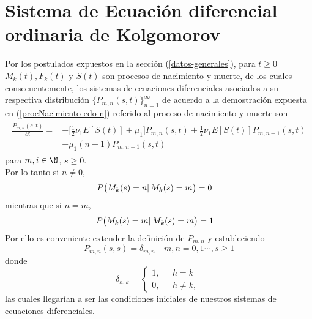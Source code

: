 \section{Sistema de Ecuación diferencial ordinaria de Kolgomorov}
Por los postulados expuestos en la sección (\ref{datos-generales}), para $t\geq 0$  $M_k(t), F_k(t)$ y $S(t)$ son procesos de nacimiento y muerte, de los cuales consecuentemente, los sistemas de ecuaciones diferenciales asociados a su respectiva distribución $\{P_{m,n}(s,t)\}_{n=1}^\infty$
de acuerdo a la demostración expuesta en (\ref{procNacimiento-edo-n}) referido al proceso de nacimiento y muerte son
\begin{eqnarray}
    \begin{array}{cr}
        \frac{P_{m,n}(s,t)}{\partial t} = & -\bigg[\frac{1}{2}\nu_1E[S(t)]+\mu_1\bigg]P_{m,n}(s,t)+\frac{1}{2}\nu_1E[S(t)]P_{m,n-1}(s,t) \\
        & +\mu_1 (n+1)P_{m,n+1}(s,t)
    \end{array}
    \label{tesis-edo-p_n}
\end{eqnarray}
para $m,i\in\N$, $s\geq 0$.\\
Por lo tanto si $n\not=0$, $$P\big(M_k(s)=n |\thinspace M_k(s)=m\big)=0\quad $$
mientras que si $n=m$, $$P\big(M_k(s)=m |\thinspace M_k(s)=m\big)=1\quad $$
Por ello es conveniente extender la definición de $P_{m,n}$ y
estableciendo $$P_{m,n}(s,s)=\delta_{m,n}\quad m,n=0,1\cdots, s\geq 1$$
donde 
$$\delta_{h,k}=
    \begin{cases}
    1, & \mbox{ $h=k$ } \\
    0, & \mbox{ $h\not=k$},
    \end{cases}$$
las cuales llegarían a ser las condiciones iniciales de nuestros sistemas de ecuaciones diferenciales.
